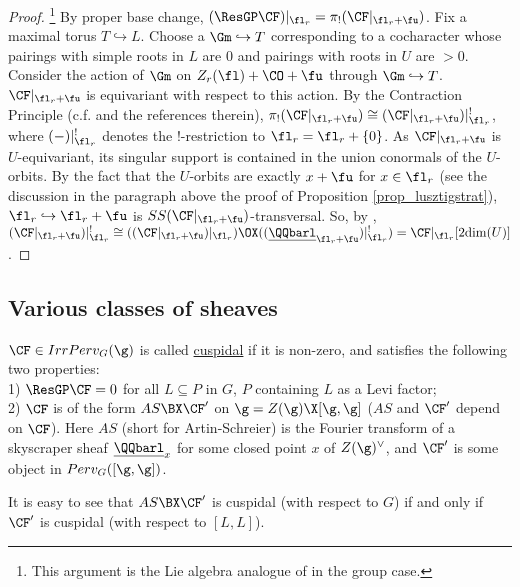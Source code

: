 \begin{proof}\footnote{This argument is the Lie algebra analogue of \cite[Proof of Theorem 4.1]{ginzburg_induction_1993} in the group case.}
    By proper base change, $(\ResGP\CF)|_{\fl_r}=\pi_!(\CF|_{\fl_r+\fu})$. Fix a maximal torus $T\hookrightarrow L$. Choose a $\Gm\hookrightarrow T$ corresponding to a cocharacter whose pairings with simple roots in $L$ are 0 and pairings with roots in $U$ are $>0$. Consider the action of $\Gm$ on $Z_r(\fl)+\CO+\fu$ through $\Gm\hookrightarrow T$. $\CF|_{\fl_r+\fu}$ is equivariant with respect to this action. By the Contraction Principle (c.f. \cite[.2]{drinfeld_compact_2015} and the references therein), $\pi_!(\CF|_{\fl_r+\fu})\cong (\CF|_{\fl_r+\fu})|^!_{\fl_r}$, where $(-)|^!_{\fl_r}$ denotes the !-restriction to $\fl_r=\fl_r+\{0\}$. As $\CF|_{\fl_r+\fu}$ is $U$-equivariant, its singular support is contained in the union conormals of the $U$-orbits. By the fact that the $U$-orbits are exactly $x+\fu$ for $x\in\fl_r$ (see the discussion in the paragraph above the proof of Proposition \ref{prop_lusztigstrat}), $\fl_r\hookrightarrow \fl_r+\fu$ is $SS(\CF|_{\fl_r+\fu})$-transversal. So, by \cite[]{barrett_singular_2023}, $(\CF|_{\fl_r+\fu})|^!_{\fl_r}\cong ((\CF|_{\fl_r+\fu})|_{\fl_r})\OX((\underline{\QQbarl}_{\fl_r+\fu})|^!_{\fl_r})=\CF|_{\fl_r}[2\mathrm{dim}(U)]$.

\end{proof}

\subsection{Various classes of sheaves}\label{sec_def_of_sheaves}
\begin{definition}\label{def_cusp}
    $\CF\in IrrPerv_G(\g)$ is called \underline{cuspidal} if it is non-zero, and satisfies the following two properties:\\ 
    1) $\ResGP\CF=0$ for all $L\subseteq P$ in $G$, $P$ containing $L$ as a Levi factor;\\
    2) $\CF$ is of the form $AS\BX\CF'$ on $\g=Z(\g)\X[\g,\g]$ ($AS$ and $\CF'$ depend on $\CF$). Here $AS$ (short for Artin-Schreier) is the Fourier transform of a skyscraper sheaf $\underline{\QQbarl}_x$ for some closed point $x$ of $Z(\g)^{\vee}$, and $\CF'$ is some object in $Perv_G([\g,\g])$. 
\end{definition}

\begin{remark}
    It is easy to see that $AS\BX\CF'$ is cuspidal (with respect to $G$) if and only if $\CF'$ is cuspidal (with respect to $[L,L]$).
\end{remark}

